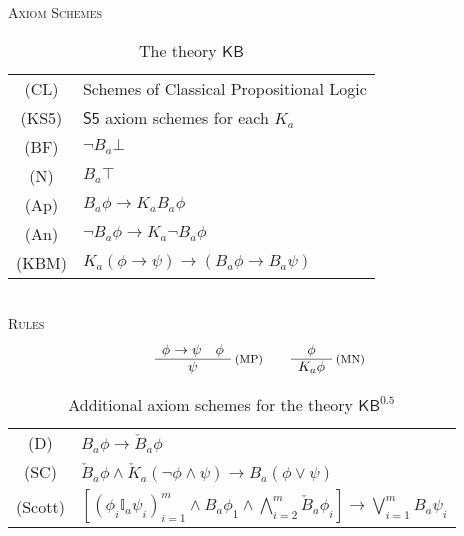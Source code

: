 \documentclass[12pt]{article}
\theoremstyle{definition}
\newcommand{\KB}{{\mathsf{KB}}}                        %
\newcommand{\KBeq}{{\mathsf{KB}^{\mathsf{0.5}}}}       %
\begin{document}
\begin{table}[ht]
  \begin{center}
    \textsc{Axiom Schemes}\\[.4em]
    \renewcommand{\arraystretch}{1.3}
    \begin{tabular}[t]{cl}
      (CL) &
      Schemes of Classical Propositional Logic
      \\
      (KS5) &
      $\mathsf{S5}$ axiom schemes for each $K_a$
      \\
      (BF) &
      $\lnot B_a\bot$
      \\
      (N) &
      $B_a\top$
      \\
      (Ap) &
      $B_a\phi\to K_aB_a\phi$
      \\
      (An) &
      $\lnot B_a\phi\to K_a\lnot B_a\phi$
      \\
      (KBM) &
      $K_a(\phi\to\psi)\to(B_a\phi\to B_a\psi)$
    \end{tabular}
    \renewcommand{\arraystretch}{1.0}
    \\[1em]
    \textsc{Rules}\vspace{-.5em}
    \[
    \begin{array}{c}
      \phi\to\psi \quad \phi
      \\\hline
      \psi
    \end{array}\;\text{\footnotesize(MP)}
    \qquad
    \begin{array}{c}
      \phi
      \\\hline
      K_a\phi
    \end{array}\;\text{\footnotesize(MN)}
    \]
  \end{center}
  \caption{The theory $\KB$}
  \label{table:KB}
\end{table}

\begin{table}[ht]
  \begin{center}
    \renewcommand{\arraystretch}{1.3}
    \begin{tabular}[t]{cl}
      (D) &
      $B_a\phi\to \check B_a\phi$
      \\
      (SC) &
      $\check B_a\phi \land 
      \check K_a(\lnot\phi\land\psi) \to 
      B_a(\phi\lor\psi)$
      \\
      (Scott) &
      $\textstyle [(\phi_i\mathbb{I}_a\psi_i)_{i=1}^m
      \land B_a\phi_1 \land \bigwedge_{i=2}^m \check B_a\phi_i] \to
      \bigvee_{i=1}^m B_a\psi_i$
    \end{tabular}
  \end{center}
  \caption{Additional axiom schemes for the theory $\KBeq$}
  \label{table:additional-schemes}
\end{table}
\end{document}
